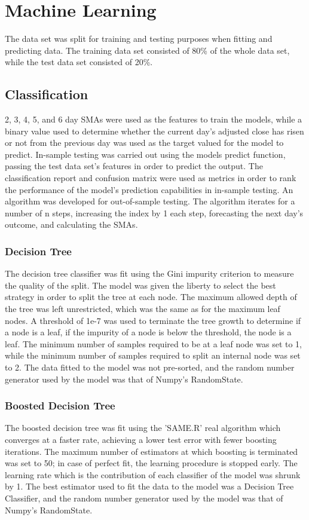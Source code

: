 \section{Machine Learning}
The data set was split for training and testing purposes when fitting and predicting data. The training data set consisted of 80\% of the whole data set, while the test data set consisted of 20\%.

\subsection{Classification}
2, 3, 4, 5, and 6 day SMAs were used as the features to train the models, while a binary value used to determine whether the current day's adjusted close has risen or not from the previous day was used as the target valued for the model to predict. In-sample testing was carried out using the models predict function, passing the test data set's features in order to predict the output. The classification report and confusion matrix were used as metrics in order to rank the performance of the model's prediction capabilities in in-sample testing. An algorithm was developed for out-of-sample testing. The algorithm iterates for a number of n steps, increasing the index by 1 each step, forecasting the next day's outcome, and calculating the SMAs. 

\subsubsection{Decision Tree}
The decision tree classifier was fit using the Gini impurity criterion to measure the quality of the split. The model was given the liberty to select the best strategy in order to split the tree at each node. The maximum allowed depth of the tree was left unrestricted, which was the same as for the maximum leaf nodes. A threshold of 1e-7 was used to terminate the tree growth to determine if a node is a leaf, if the impurity of a node is below the threshold, the node is a leaf. The minimum number of samples required to be at a leaf node was set to 1, while the minimum number of samples required to split an internal node was set to 2. The data fitted to the model was not pre-sorted, and the random number generator used by the model was that of Numpy's RandomState.

\subsubsection{Boosted Decision Tree}
The boosted decision tree was fit using the 'SAME.R' real algorithm which converges at a faster rate, achieving a lower test error with fewer boosting iterations. The maximum number of estimators at which boosting is terminated was set to 50; in case of perfect fit, the learning procedure is stopped early. The learning rate which is the contribution of each classifier of the model was shrunk by 1. The best estimator used to fit the data to the model was a Decision Tree Classifier, and the random number generator used by the model was that of Numpy's RandomState. 

